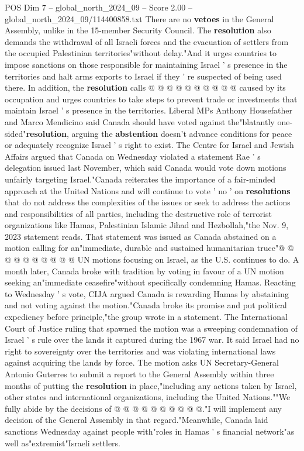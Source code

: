 \begin{textsample}{POS Dim 7 – global\_north\_2024\_09 – Score 2.00 – global\_north\_2024\_09/114400858.txt}
There are no \textbf{vetoes} in the General Assembly, unlike in the 15-member Security Council.
The \textbf{resolution} also demands the withdrawal of all Israeli forces and the evacuation of settlers from the occupied Palestinian territories"without delay."And it urges countries to impose sanctions on those responsible for maintaining Israel ' s presence in the territories and halt arms exports to Israel if they ' re suspected of being used there.
In addition, the \textbf{resolution} calls @ @ @ @ @ @ @ @ @ @ caused by its occupation and urges countries to take steps to prevent trade or investments that maintain Israel ' s presence in the territories.
Liberal MPs Anthony Housefather and Marco Mendicino said Canada should have voted against the"blatantly one-sided"\textbf{resolution}, arguing the \textbf{abstention} doesn't advance conditions for peace or adequately recognize Israel ' s right to exist.
The Centre for Israel and Jewish Affairs argued that Canada on Wednesday violated a statement Rae ' s delegation issued last November, which said Canada would vote down motions unfairly targeting Israel."Canada reiterates the importance of a fair-minded approach at the United Nations and will continue to vote ' no ' on \textbf{resolutions} that do not address the complexities of the issues or seek to address the actions and responsibilities of all parties, including the destructive role of terrorist organizations like Hamas, Palestinian Islamic Jihad and Hezbollah,"the Nov. 9, 2023 statement reads.
That statement was issued as Canada abstained on a motion calling for an"immediate, durable and sustained humanitarian truce"@ @ @ @ @ @ @ @ @ @ UN motions focusing on Israel, as the U.S. continues to do.
A month later, Canada broke with tradition by voting in favour of a UN motion seeking an"immediate ceasefire"without specifically condemning Hamas.
Reacting to Wednesday ' s vote, CIJA argued Canada is rewarding Hamas by abstaining and not voting against the motion."Canada broke its promise and put political expediency before principle,"the group wrote in a statement.
The International Court of Justice ruling that spawned the motion was a sweeping condemnation of Israel ' s rule over the lands it captured during the 1967 war.
It said Israel had no right to sovereignty over the territories and was violating international laws against acquiring the lands by force.
The motion asks UN Secretary-General Antonio Guterres to submit a report to the General Assembly within three months of putting the \textbf{resolution} in place,"including any actions taken by Israel, other states and international organizations, including the United Nations.""We fully abide by the decisions of @ @ @ @ @ @ @ @ @ @."I will implement any decision of the General Assembly in that regard."Meanwhile, Canada laid sanctions Wednesday against people with"roles in Hamas ' s financial network"as well as"extremist"Israeli settlers.

\end{textsample}
